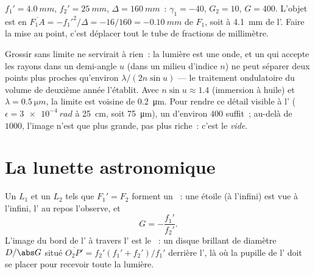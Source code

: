 \begin{example}\label{ex:b1:optical-instruments:micronum}
 $f_1' = \qty{4.0}{mm}$,  $f_2' = \qty{25}{mm}$,
$\Delta = \qty{160}{mm}$~: $\gamma_1 = -40$, $G_2 = 10$, $G = 400$.
L'objet est en $\overline{F_1A} = -f_1'^2/\Delta = -16/160 =
\qty{-0.10}{mm}$ de $F_1$, soit à \qty{4.1}{mm} de l'. Faire la
mise au point, c'est déplacer tout le tube de fractions de millimètre.
\end{example}

\begin{remark}\label{rem:b1:optical-instruments:abbe}
Grossir sans limite ne servirait à rien~: la lumière est une onde, et un
 qui accepte les rayons dans un demi-angle $u$ (dans un milieu
d'indice $n$) ne peut séparer deux points plus proches qu'environ
$\lambda/(2n\sin u)$ --- le traitement ondulatoire du volume de deuxième
année l'établit. Avec $n\sin u \approx 1.4$ (immersion à huile) et $\lambda =
\qty{0.5}{\micro m}$, la limite est voisine de \qty{0.2}{\micro m}. Pour
rendre ce détail visible à l' ($\epsilon = \qty{3e-4}{rad}$ à
\qty{25}{cm}, soit \qty{75}{\micro m}), un  d'environ $400$
suffit~; au-delà de $1000$, l'image n'est que plus grande, pas plus
riche~: c'est le \emph{ vide}.
\end{remark}

\section{La lunette astronomique}

\begin{proposition}\label{prop:b1:optical-instruments:telescope}
Un  $L_1$ et un  $L_2$ tels que $F_1' = F_2$ forment un
~: une étoile (à l'infini) est vue à l'infini, l' au
repos l'observe, et
\[
G = -\frac{f_1'}{f_2'} .
\]
L'image du bord de l' à travers l' est le \emph{}~: un disque brillant de diamètre $D/\abs G$ situé
$\overline{O_2P'} = f_2'(f_1' + f_2')/f_1'$ derrière l', là où
la pupille de l' doit se placer pour recevoir toute la lumière.
\end{proposition}

